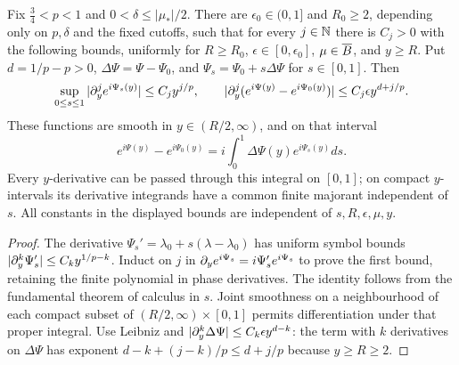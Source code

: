 \begin{lemma}
  \label{lem:c04_phase_exponential_difference}
  Fix $\frac34<p<1$ and $0<\delta\le|\mu_*|/2$.
  There are $\epsilon_0\in(0,1]$ and $R_0\ge2$, depending only on $p,\delta$ and
  the fixed cutoffs, such that for every $j\in\mathbb{N}$ there is $C_j>0$ with the following
  bounds, uniformly for $R\ge R_0$, $\epsilon\in[0,\epsilon_0]$, $\mu\in\overline{B}$, and $y\ge R$.
  Put $d=1/p-p>0$, $\Delta\Psi=\Psi-\Psi_0$, and
  $\Psi_s=\Psi_0+s\Delta\Psi$ for $s\in[0,1]$. Then
  \[
    \sup_{0\le s\le1}|\partial_y^je^{i\Psi_s(y)}|\le C_jy^{j/p},\qquad
    |\partial_y^j(e^{i\Psi(y)}-e^{i\Psi_0(y)})|\le C_j\epsilon y^{d+j/p}.
  \]
  These functions are smooth in $y\in(R/2,\infty)$, and on that interval
  \[
    e^{i\Psi(y)}-e^{i\Psi_0(y)}
      =i\int_0^1\Delta\Psi(y)e^{i\Psi_s(y)}ds.
  \]
  Every $y$-derivative can be passed through this integral on $[0,1]$; on compact
  $y$-intervals its derivative integrands have a common finite majorant independent of $s$.
  All constants in the displayed bounds are independent of $s,R,\epsilon,\mu,y$.
\end{lemma}
\begin{proof}
  The derivative $\Psi_s'=\lambda_0+s(\lambda-\lambda_0)$ has uniform symbol bounds
  $|\partial_y^k\Psi_s'|\le C_ky^{1/p-k}$.
  Induct on $j$ in $\partial_y e^{i\Psi_s}=i\Psi_s'e^{i\Psi_s}$ to prove the first bound,
  retaining the finite polynomial in phase derivatives.
  The identity follows from the fundamental theorem of calculus in $s$.
  Joint smoothness on a neighbourhood of each compact subset of
  $(R/2,\infty)\times[0,1]$ permits differentiation under that proper integral.
  Use Leibniz and $|\partial_y^k\Delta\Psi|\le C_k\epsilon y^{d-k}$:
  the term with $k$ derivatives on $\Delta\Psi$ has exponent
  $d-k+(j-k)/p\le d+j/p$ because $y\ge R\ge2$.
\end{proof}

